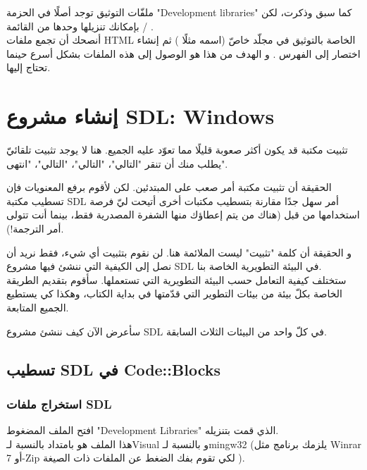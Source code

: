 ملفّات التوثيق توجد أصلًا في الحزمة
"\textenglish{Development libraries}"
كما سبق وذكرت، لكن بإمكانك تنزيلها وحدها من القائمة
 / .\\
أنصحك أن تجمع ملفات
\textenglish{HTML}
الخاصة بالتوثيق في مجلّد خاصّ (اسمه مثلًا
)
ثم إنشاء اختصار إلى الفهرس
.
و الهدف من هذا هو الوصول إلى هذه الملفات بشكل أسرع حينما تحتاج إليها.

\section{إنشاء مشروع \textenglish{SDL}: \textenglish{Windows}}

تثبيت مكتبة قد يكون أكثر صعوبة قليلًا مما تعوّد عليه الجميع. هنا لا يوجد تثبيت تلقائيّ يطلب منك أن تنقر "التالي"، "التالي"، "التالي"، "انتهى".

الحقيقة أن تثبيت مكتبة أمر صعب على المبتدئين. لكن لأقوم برفع المعنويات فإن تسطيب مكتبة 
\textenglish{SDL}
أمر سهل جدًا مقارنة بتسطيب مكتبات أخرى أتيحت ليّ فرصة استخدامها من قبل (هناك من يتم إعطاؤك منها الشفرة المصدرية فقط، بينما أنت تتولى أمر الترجمة!).

و الحقيقة أن كلمة "تثبيت" ليست الملائمة هنا. لن نقوم بتثبيت أي شيء، فقط نريد أن نصل إلى الكيفية التي ننشئ فيها مشروع 
\textenglish{SDL}
في البيئة التطويرية الخاصة بنا.\\
ستختلف كيفية التعامل حسب البيئة التطويرية التي تستعملها. سأقوم بتقديم الطريقة الخاصة بكلّ بيئة من بيئات التطوير التي قدّمتها في بداية الكتاب، وهكذا كي يستطيع الجميع المتابعة.

سأعرض الآن كيف ننشئ مشروع
\textenglish{SDL}
في كلّ واحد من البيئات الثلاث السابقة.

\subsection{تسطيب \textenglish{SDL} في \textenglish{Code::Blocks}}

\subsubsection{استخراج ملفات \textenglish{SDL}}

افتح الملف المضغوط
"\textenglish{Development Libraries}"
الذي قمت بتنزيله.\\
هذا الملف هو بامتداد
بالنسبة لـ\textenglish{Visual}
و 
بالنسبة لـ\textenglish{mingw32}
(يلزمك برنامج مثل 
\textenglish{Winrar}
أو
\textenglish{7-Zip}
لكي تقوم بفك الضغط عن الملفات ذات الصيغة 
).

